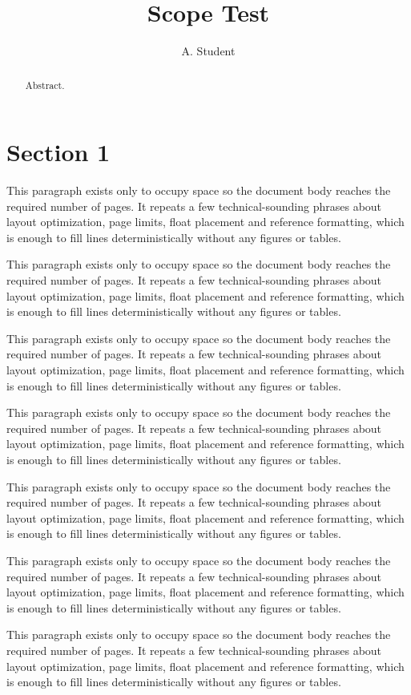 \documentclass[10pt,letterpaper]{article}
\title{Scope Test}\author{A. Student}
\begin{document}
\maketitle
\begin{abstract}Abstract.\end{abstract}
\section{Section 1}
This paragraph exists only to occupy space so the document body reaches the required number of pages. It repeats a few technical-sounding phrases about layout optimization, page limits, float placement and reference formatting, which is enough to fill lines deterministically without any figures or tables.

This paragraph exists only to occupy space so the document body reaches the required number of pages. It repeats a few technical-sounding phrases about layout optimization, page limits, float placement and reference formatting, which is enough to fill lines deterministically without any figures or tables.

This paragraph exists only to occupy space so the document body reaches the required number of pages. It repeats a few technical-sounding phrases about layout optimization, page limits, float placement and reference formatting, which is enough to fill lines deterministically without any figures or tables.

This paragraph exists only to occupy space so the document body reaches the required number of pages. It repeats a few technical-sounding phrases about layout optimization, page limits, float placement and reference formatting, which is enough to fill lines deterministically without any figures or tables.

This paragraph exists only to occupy space so the document body reaches the required number of pages. It repeats a few technical-sounding phrases about layout optimization, page limits, float placement and reference formatting, which is enough to fill lines deterministically without any figures or tables.

This paragraph exists only to occupy space so the document body reaches the required number of pages. It repeats a few technical-sounding phrases about layout optimization, page limits, float placement and reference formatting, which is enough to fill lines deterministically without any figures or tables.

This paragraph exists only to occupy space so the document body reaches the required number of pages. It repeats a few technical-sounding phrases about layout optimization, page limits, float placement and reference formatting, which is enough to fill lines deterministically without any figures or tables.
\end{document}

